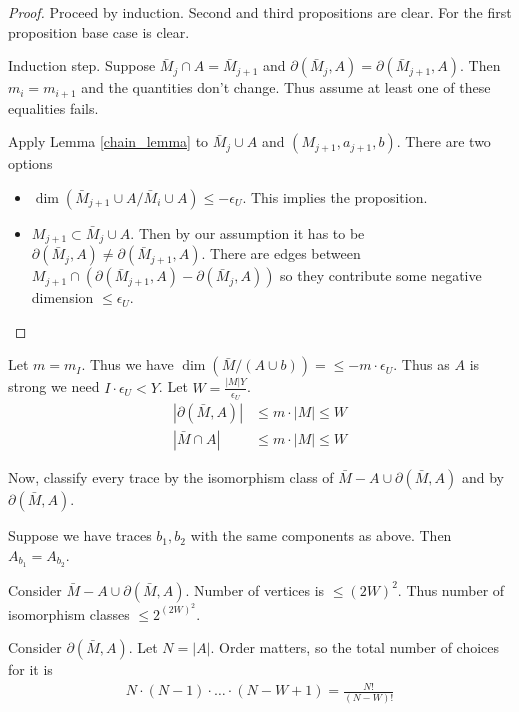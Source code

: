 \documentclass{amsart}
\begin{document}
\begin{proof}
	Proceed by induction.
	Second and third propositions are clear.
	For the first proposition base case is clear.
	
	Induction step.
	Suppose $\bar M_j \cap A = \bar M_{j+1}$ and $\partial(\bar M_j, A) = \partial(\bar M_{j+1}, A)$.
	Then $m_i = m_{i+1}$ and the quantities don't change.
	Thus assume at least one of these equalities fails.
	
	Apply Lemma \ref{chain_lemma} to $\bar M_j \cup A$ and $(M_{j+1}, a_{j+1},b)$.
	There are two options
	
	\begin{itemize}
		\item $\dim(\bar M_{j+1} \cup A / \bar M_i \cup A) \leq -\epsilon_U$.
		This implies the proposition.
		\item $M_{j+1} \subset \bar M_j \cup A$.
		Then by our assumption it has to be $\partial(\bar M_j, A) \neq \partial(\bar M_{j+1}, A)$.
		There are edges between $M_{j+1} \cap (\partial(\bar M_{j+1}, A) - \partial(\bar M_j, A))$ so they contribute some negative dimension $\leq \epsilon_U$.
	\end{itemize}
\end{proof}

Let $m = m_I$.
Thus we have $\dim(\bar M / (A \cup b)) = \leq -m \cdot \epsilon_U $.
Thus as $A$ is strong we need $I \cdot \epsilon_U < Y$.
Let $W = \frac{|M|Y}{\epsilon_U}$.
\begin{align*}
	|\partial(\bar M, A)| &\leq m \cdot |M| \leq W \\
	|\bar M \cap A| &\leq m \cdot |M| \leq W
\end{align*}

Now, classify every trace by the isomorphism class of $\bar M - A \cup \partial(\bar M, A)$ and by $\partial(\bar M, A)$.
\begin{Lemma}
	Suppose we have traces $b_1, b_2$ with the same components as above.
	Then $A_{b_1} = A_{b_2}$.
\end{Lemma}

Consider $\bar M - A \cup \partial(\bar M, A)$.
Number of vertices is $\leq (2W)^2$.
Thus number of isomorphism classes $\leq 2^{(2W)^2}$.

Consider $\partial(\bar M, A)$.
Let $N = |A|$.
Order matters, so the total number of choices for it is
\begin{align*}
	N \cdot (N-1) \cdot \ldots \cdot (N - W + 1) = \frac{N!}{(N-W)!}
\end{align*}
\end{document}
